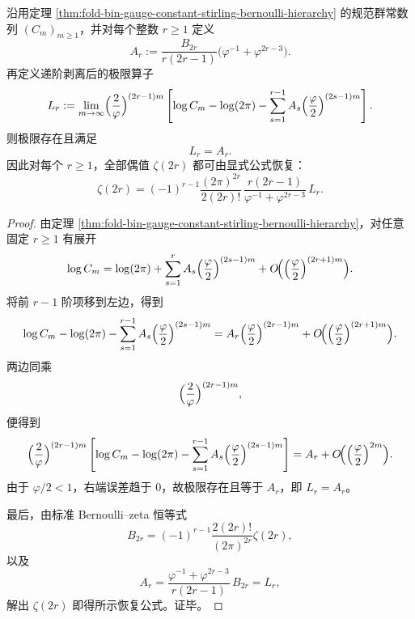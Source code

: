 \begin{theorem}\label{thm:xi-time-part60aa-gauge-constant-explicit-even-zeta-recovery}
沿用定理 \ref{thm:fold-bin-gauge-constant-stirling-bernoulli-hierarchy} 的规范群常数列 \((C_m)_{m\ge 1}\)，并对每个整数 \(r\ge 1\) 定义
\[
A_r:=
\frac{B_{2r}}{r(2r-1)}
\bigl(\varphi^{-1}+\varphi^{2r-3}\bigr).
\]
再定义递阶剥离后的极限算子
\[
L_r:=
\lim_{m\to\infty}
\Bigl(\frac{2}{\varphi}\Bigr)^{(2r-1)m}
\left[
\log C_m-\log(2\pi)
-\sum_{s=1}^{r-1}A_s\Bigl(\frac{\varphi}{2}\Bigr)^{(2s-1)m}
\right].
\]
则极限存在且满足
\[
\boxed{\;L_r=A_r.\;}
\]
因此对每个 \(r\ge 1\)，全部偶值 \(\zeta(2r)\) 都可由显式公式恢复：
\[
\boxed{\;
\zeta(2r)
=
(-1)^{r-1}
\frac{(2\pi)^{2r}}{2(2r)!}\,
\frac{r(2r-1)}{\varphi^{-1}+\varphi^{2r-3}}\,
L_r.\;}
\]
\end{theorem}
\begin{proof}
由定理 \ref{thm:fold-bin-gauge-constant-stirling-bernoulli-hierarchy}，对任意固定 \(r\ge 1\) 有展开
\[
\log C_m
=
\log(2\pi)
+\sum_{s=1}^{r}A_s\Bigl(\frac{\varphi}{2}\Bigr)^{(2s-1)m}
+O\!\Bigl(\Bigl(\frac{\varphi}{2}\Bigr)^{(2r+1)m}\Bigr).
\]
将前 \(r-1\) 阶项移到左边，得到
\[
\log C_m-\log(2\pi)
-\sum_{s=1}^{r-1}A_s\Bigl(\frac{\varphi}{2}\Bigr)^{(2s-1)m}
=
A_r\Bigl(\frac{\varphi}{2}\Bigr)^{(2r-1)m}
+O\!\Bigl(\Bigl(\frac{\varphi}{2}\Bigr)^{(2r+1)m}\Bigr).
\]
两边同乘
\[
\Bigl(\frac{2}{\varphi}\Bigr)^{(2r-1)m},
\]
便得到
\[
\Bigl(\frac{2}{\varphi}\Bigr)^{(2r-1)m}
\left[
\log C_m-\log(2\pi)
-\sum_{s=1}^{r-1}A_s\Bigl(\frac{\varphi}{2}\Bigr)^{(2s-1)m}
\right]
=
A_r
+O\!\Bigl(\Bigl(\frac{\varphi}{2}\Bigr)^{2m}\Bigr).
\]
由于 \(\varphi/2<1\)，右端误差趋于 \(0\)，故极限存在且等于 \(A_r\)，即 \(L_r=A_r\)。

最后，由标准 Bernoulli--zeta 恒等式
\[
B_{2r}
=
(-1)^{r-1}\frac{2(2r)!}{(2\pi)^{2r}}\zeta(2r),
\]
以及
\[
A_r=
\frac{\varphi^{-1}+\varphi^{2r-3}}{r(2r-1)}\,B_{2r}
=L_r,
\]
解出 \(\zeta(2r)\) 即得所示恢复公式。证毕。
\end{proof}

